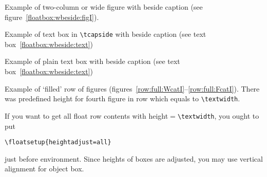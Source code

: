 \Text

\fi

\clearpage
Example of two-column or wide figure with beside caption (see figure~\ref{floatbox:wbeside:figI}).

\begin{figure*}[!t]
{\caption{Wide beside caption width of object equals to width of
graphics. \text}%
\label{floatbox:wbeside:figI}}
\end{figure*}

\Text

\clearpage
Example of text box in \verb|\tcapside| with beside caption (see text box~\ref{floatbox:wbeside:text})

\begin{textbox*}
\tcapside[1.2\hsize]
{\TEXTBOX}
{\caption{Wide beside caption width of object box equals to 1.2``column'' width. \text}%
\label{floatbox:wbeside:text}}
\end{textbox*}

\Text

\clearpage
Example of plain text box with beside caption (see text box~\ref{floatbox:wbeside:text})

\begin{textbox*}
{\TEXTBOX}
{\caption{Wide beside caption. \text}%
\label{floatbox:wbeside:text}}
\end{textbox*}

\Text

\clearpage
Example of `filled' row of figures
(figures~\ref{row:full:WcatI}--\ref{row:full:FcatI}).
There was predefined height for fourth figure in row which equals to
\verb|\textwidth|.

If you want to get all float row contents with height${}={}$\verb|\textwidth|, you ought to put
\begin{verbatim}
\floatsetup{heightadjust=all}
\end{verbatim}
just before  environment. Since heights of boxes are adjusted,
you may use vertical alignment for object box.

